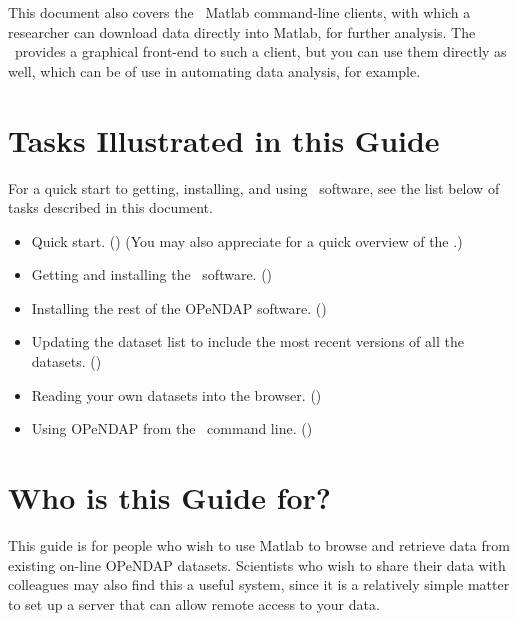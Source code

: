 This document also covers the \OPD\ Matlab command-line clients, with
which a researcher can download data directly into Matlab, for further
analysis.  The \GUI\ provides a graphical front-end to such a client,
but you can use them directly as well, which can be of use in
automating data analysis, for example.

\section{Tasks Illustrated in this Guide}
\label{pref,tasks}

For a quick start to getting, installing, and using \GUI\
software, see the list below of tasks described in this document.

\begin{itemize}

\item Quick start. () (You may also
  appreciate \OPDquick for a quick overview of the \OPD.)

\item Getting and installing the \GUI\ software. 
()

\item Installing the rest of the OPeNDAP software. 
(\pagexref{gui,install})

\item Updating the dataset list to include the most recent versions of
all the datasets. (\pagexref{gui,intro,update})

\item Reading your own datasets into the browser. 
()

\item Using OPeNDAP from the \matlab\ command
  line. () 


\end{itemize}


\section{Who is this Guide for?}
\label{pref,who}

This guide is for people who wish to use Matlab to browse and retrieve
data from existing on-line OPeNDAP datasets. Scientists who wish
to share their data with colleagues may also find this a useful
system, since it is a relatively simple matter to set up a server that
can allow remote access to your data.


